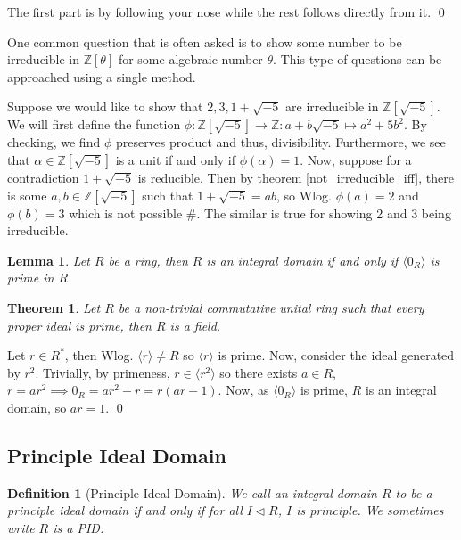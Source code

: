 \documentclass[
]{article}
\newtheorem{theorem}{Theorem}
\newtheorem{lemma}{Lemma}
\newtheorem{definition}{Definition}[theorem]
\begin{document}
The first part is by following your nose while the rest follows directly
from it. \qed

One common question that is often asked is to show some number to be
irreducible in \(\mathbb{Z}[\theta]\) for some algebraic number
\(\theta\). This type of questions can be approached using a single
method.

Suppose we would like to show that \(2, 3, 1 + \sqrt{-5}\) are
irreducible in \(\mathbb{Z}[\sqrt{-5}]\). We will first define the
function
\(\phi : \mathbb{Z}[\sqrt{-5}] \to \mathbb{Z} : a + b\sqrt{-5} \mapsto a^2 + 5b^2\).
By checking, we find \(\phi\) preserves product and thus, divisibility.
Furthermore, we see that \(\alpha \in \mathbb{Z}[\sqrt{-5}]\) is a unit
if and only if \(\phi(\alpha) = 1\). Now, suppose for a contradiction
\(1 + \sqrt{-5}\) is reducible. Then by theorem
\ref{not_irreducible_iff}, there is some
\(a, b \in \mathbb{Z}[\sqrt{-5}]\) such that \(1 + \sqrt{-5} = ab\), so
Wlog. \(\phi(a) = 2\) and \(\phi(b) = 3\) which is not possible \#. The
similar is true for showing 2 and 3 being irreducible.

\begin{lemma}
  Let \(R\) be a ring, then \(R\) is an integral domain if and only if 
  \(\langle 0_R \rangle\) is prime in \(R\).
\end{lemma}

\begin{theorem}
  Let \(R\) be a non-trivial commutative unital ring such that every proper 
  ideal is prime, then \(R\) is a field.
\end{theorem}
\proof

Let \(r \in R^*\), then Wlog. \(\langle r \rangle \neq R\) so
\(\langle r \rangle\) is prime. Now, consider the ideal generated by
\(r^2\). Trivially, by primeness, \(r \in \langle r^2 \rangle\) so there
exists \(a \in R\), \(r = ar^2 \implies 0_R = ar^2 - r = r(ar - 1)\).
Now, as \(\langle 0_R \rangle\) is prime, \(R\) is an integral domain,
so \(ar = 1\). \qed

\hypertarget{principle-ideal-domain}{%
\subsection{Principle Ideal Domain}\label{principle-ideal-domain}}

\begin{definition}[Principle Ideal Domain]
  We call an integral domain \(R\) to be a \textit{principle ideal domain} if 
  and only if for all \(I \triangleleft R\), \(I\) is principle. We sometimes 
  write \(R\) is a \textit{PID}.
\end{definition}
\end{document}

